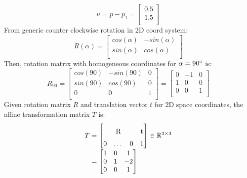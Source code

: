 \documentclass{article}
\begin{document}
\[
    u = p - p_1 =
    \begin{bmatrix}
        0.5 \\ 1.5 \\
    \end{bmatrix}
\]
From generic counter clockwise rotation in 2D coord system:
\[
    R(\alpha) =
    \begin{bmatrix}
        cos(\alpha) & -sin(\alpha) \\
        sin(\alpha) & cos(\alpha)  \\
    \end{bmatrix}
\]
Then, rotation matrix with homogeneous coordinates for $\alpha = 90\degree$ is:
\[
    R_{90} =
    \begin{bmatrix}
        cos(90) & -sin(90) & 0 \\
        sin(90) & cos(90)  & 0 \\
        0       & 0        & 1 \\
    \end{bmatrix}
    =
    \begin{bmatrix}
        0 & -1 & 0 \\
        1 & 0  & 0 \\
        0 & 0  & 1 \\
    \end{bmatrix}
\]
Given rotation matrix $R$ and translation vector $t$ for 2D space coordinates,
the affine transformation matrix $T$ is:
\begin{equation*}
    \begin{aligned}
        T & =
        \begin{bmatrix}
            \multicolumn{3}{c}{\multirow{2}{*}{R}} & \multirow{2}{*}{t}         \\
            \multicolumn{4}{c}{}                                                \\
            0                                      & \dots              & 0 & 1 \\
        \end{bmatrix}
        \in \mathbb{R}^{3 \times 3} \\[-0.5ex]
          & = \begin{bmatrix}
                  1 & 0 & 1  \\
                  0 & 1 & -2 \\
                  0 & 0 & 1  \\
              \end{bmatrix}
    \end{aligned}
\end{equation*}
\end{document}

